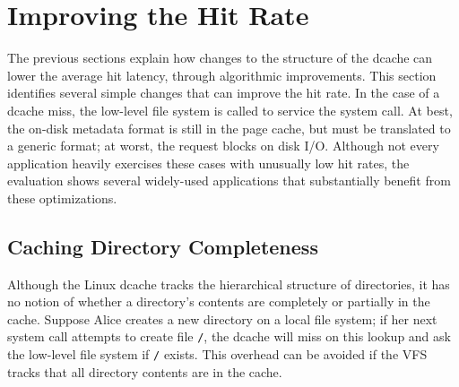 \section{Improving the Hit Rate}
\label{sec:readdir}

The previous sections explain how changes to the structure of the dcache
can lower the average hit latency, through algorithmic improvements.
This section identifies several simple changes that can improve the hit rate.
In the case of a dcache miss, the low-level file system is called to service the system call.
At best, the on-disk metadata format is still in the page cache, but must be translated
to a generic format; at worst, the request blocks on disk I/O.
Although not every application heavily exercises these cases with unusually low hit rates,
the evaluation shows several widely-used applications that substantially benefit 
from these optimizations.


\subsection{Caching Directory Completeness}

Although the Linux dcache tracks the hierarchical structure of directories, 
it has no notion of whether a directory's contents are completely or partially in the cache.
Suppose Alice creates a new directory {\tt \fnone{}} on a local file system; 
if her next system call attempts to create
file {\tt \fnone{}/\fntwo{}}, the dcache will miss on this lookup and ask the low-level file system if {\tt \fnone{}/\fntwo{}} exists.  
This overhead can be avoided if the VFS tracks that
all directory contents are in the cache.

